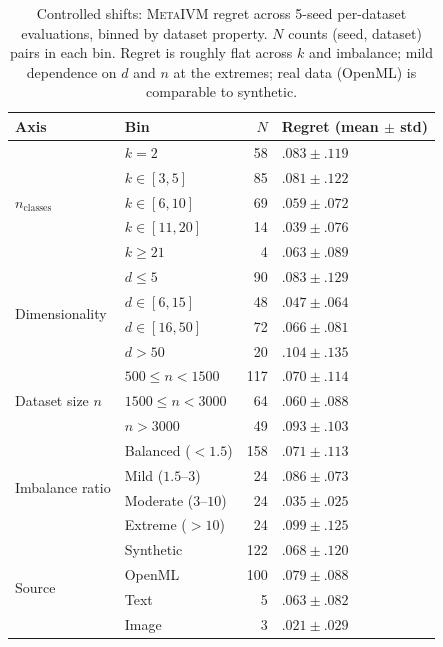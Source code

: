 \documentclass[10pt]{article} %
\newcommand{\ours}{\textsc{MetaIVM}}
\begin{document}
\begin{table}[t]
\centering
\caption{Controlled shifts: \ours{} regret across 5-seed per-dataset evaluations, binned by dataset property. $N$ counts (seed, dataset) pairs in each bin. Regret is roughly flat across $k$ and imbalance; mild dependence on $d$ and $n$ at the extremes; real data (OpenML) is comparable to synthetic.}
\label{tab:shifts}
\small
\begin{tabular}{llrl}
\toprule
\textbf{Axis} & \textbf{Bin} & $N$ & \textbf{Regret (mean $\pm$ std)} \\
\midrule
\multirow{5}{*}{$n_{\text{classes}}$}
  & $k = 2$ & 58 & $.083 \pm .119$ \\
  & $k \in [3, 5]$ & 85 & $.081 \pm .122$ \\
  & $k \in [6, 10]$ & 69 & $.059 \pm .072$ \\
  & $k \in [11, 20]$ & 14 & $.039 \pm .076$ \\
  & $k \geq 21$ & 4 & $.063 \pm .089$ \\
\midrule
\multirow{4}{*}{Dimensionality}
  & $d \leq 5$ & 90 & $.083 \pm .129$ \\
  & $d \in [6, 15]$ & 48 & $.047 \pm .064$ \\
  & $d \in [16, 50]$ & 72 & $.066 \pm .081$ \\
  & $d > 50$ & 20 & $.104 \pm .135$ \\
\midrule
\multirow{3}{*}{Dataset size $n$}
  & $500 \leq n < 1500$ & 117 & $.070 \pm .114$ \\
  & $1500 \leq n < 3000$ & 64 & $.060 \pm .088$ \\
  & $n > 3000$ & 49 & $.093 \pm .103$ \\
\midrule
\multirow{4}{*}{Imbalance ratio}
  & Balanced ($<1.5$) & 158 & $.071 \pm .113$ \\
  & Mild ($1.5$--$3$) & 24 & $.086 \pm .073$ \\
  & Moderate ($3$--$10$) & 24 & $.035 \pm .025$ \\
  & Extreme ($>10$) & 24 & $.099 \pm .125$ \\
\midrule
\multirow{4}{*}{Source}
  & Synthetic & 122 & $.068 \pm .120$ \\
  & OpenML & 100 & $.079 \pm .088$ \\
  & Text & 5 & $.063 \pm .082$ \\
  & Image & 3 & $.021 \pm .029$ \\
\bottomrule
\end{tabular}
\end{table}
\end{document}
